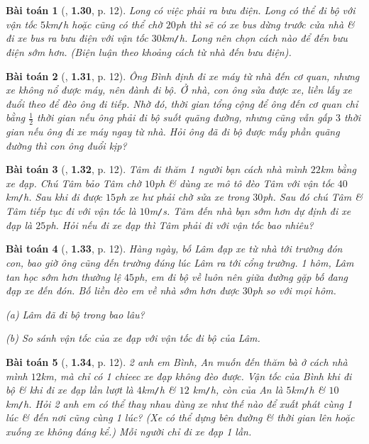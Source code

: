 \documentclass{article}
\numberwithin{equation}{section}
\newtheorem{baitoan}{Bài toán}[section]
\begin{document}
\begin{baitoan}[\cite{Van2022}, \textbf{1.30}, p. 12]
	Long có việc phải ra bưu điện. Long có thể đi bộ với vận tốc $5$\emph{km\texttt{/}h} hoặc cũng có thể chờ $20$\emph{ph} thì sẽ có xe bus dừng trước cửa nhà \& đi xe bus ra bưu điện với vận tốc $30$\emph{km\texttt{/}h}. Long nên chọn cách nào để đến bưu điện sớm hơn. (Biện luận theo khoảng cách từ nhà đến bưu điện).
\end{baitoan}

\begin{baitoan}[\cite{Van2022}, \textbf{1.31}, p. 12]
	Ông Bình định đi xe máy từ nhà đến cơ quan, nhưng xe không nổ được máy, nên đành đi bộ. Ở nhà, con ông sửa được xe, liền lấy xe đuổi theo để đèo ông đi tiếp. Nhờ đó, thời gian tổng cộng để ông đến cơ quan chỉ bằng $\frac{1}{2}$ thời gian nếu ông phải đi bộ suốt quãng đường, nhưng cũng vẫn gấp $3$ thời gian nếu ông đi xe máy ngay từ nhà. Hỏi ông đã đi bộ được mấy phần quãng đường thì con ông đuổi kịp?
\end{baitoan}

\begin{baitoan}[\cite{Van2022}, \textbf{1.32}, p. 12]
	Tâm đi thăm 1 người bạn cách nhà mình $22$\emph{km} bằng xe đạp. Chú Tâm bảo Tâm chờ $10$\emph{ph} \& dùng xe mô tô đèo Tâm với vận tốc $40$\emph{km\texttt{/}h}. Sau khi đi được $15$\emph{ph} xe hư phải chờ sửa xe trong $30$\emph{ph}. Sau đó chú Tâm \& Tâm tiếp tục đi với vận tốc là $10$\emph{m\texttt{/}s}. Tâm đến nhà bạn sớm hơn dự định đi xe đạp là $25$\emph{ph}. Hỏi nếu đi xe đạp thì Tâm phải đi với vận tốc bao nhiêu?
\end{baitoan}

\begin{baitoan}[\cite{Van2022}, \textbf{1.33}, p. 12]
	Hàng ngày, bố Lâm đạp xe từ nhà tới trường đón con, bao giờ ông cũng đến trường đúng lúc Lâm ra tới cổng trường. 1 hôm, Lâm tan học sớm hơn thường lệ $45$\emph{ph}, em đi bộ về luôn nên giữa đường gặp bố đang đạp xe đến đón. Bố liền đèo em về nhà sớm hơn được $30$\emph{ph} so với mọi hôm.
	\begin{enumerate*}
		\item[(a)] Lâm đã đi bộ trong bao lâu?
		\item[(b)] So sánh vận tốc của xe đạp với vận tốc đi bộ của Lâm.
	\end{enumerate*}
\end{baitoan}

\begin{baitoan}[\cite{Van2022}, \textbf{1.34}, p. 12]
	2 anh em Bình, An muốn đến thăm bà ở cách nhà mình $12$\emph{km}, mà chỉ có 1 chieec xe đạp không đèo được. Vận tốc của Bình khi đi bộ \& khi đi xe đạp lần lượt là $4$\emph{km\texttt{/}h} \& $12$	\emph{km\texttt{/}h}, còn của An là $5$\emph{km\texttt{/}h} \& $10$\emph{km\texttt{/}h}. Hỏi 2 anh em có thể thay nhau dùng xe như thế nào để xuất phát cùng 1 lúc \& đến nơi cũng cùng 1 lúc? (Xe có thể dựng bên đường \& thời gian lên hoặc xuống xe không đáng kể.) Mỗi người chỉ đi xe đạp 1 lần.
\end{baitoan}
\end{document}
